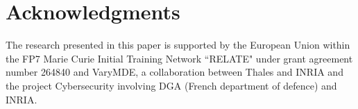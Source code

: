 \documentclass[runningheads,a4paper]{llncs}
\begin{document}



%



%



\section*{Acknowledgments}
The research presented in this paper is supported by the European Union within the FP7 Marie Curie Initial Training Network ``RELATE" under grant agreement number 264840 and VaryMDE, a collaboration between Thales and INRIA and the project Cybersecurity involving DGA (French department of defence) and INRIA.



\end{document}
